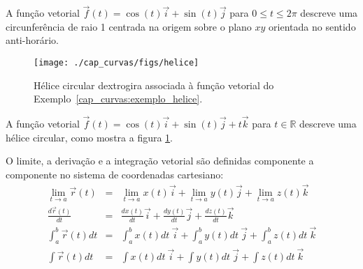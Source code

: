 \begin{ex}
A função vetorial $\vec{f}(t)=\cos(t)\vec{i}+\sin(t)\vec{j}$ para $0\leq t \leq 2\pi$ descreve  uma circunferência de raio 1 centrada na origem sobre o plano $xy$ orientada no sentido anti-horário.
\end{ex}

\begin{figure}%
\begin{center}
    \texttt{[image: ./cap\_curvas/figs/helice]}
\caption{\label{helicedex}Hélice circular dextrogira associada à função vetorial do Exemplo~\ref{cap_curvas:exemplo_helice}.}
  \end{center}
\end{figure}

\begin{ex}\label{cap_curvas:exemplo_helice}
A função vetorial $\vec{f}(t)=\cos(t)\vec{i}+\sin(t)\vec{j}+t\vec{k}$ para $ t \in\mathbb{R}$ descreve uma hélice circular, como mostra a figura \ref{helicedex}.
\end{ex}

O limite, a derivação e a integração vetorial são definidas componente a componente no sistema de coordenadas cartesiano:
\begin{eqnarray}
\lim_{t\to a}\vec{r}(t)&=&\lim_{t\to a}x(t) \vec{i}+\lim_{t\to a}y(t)\vec{j}+\lim_{t\to a}z(t)\vec{k}\label{deflim}\\
\frac{d\vec{r}(t)}{dt}&=&\frac{d x(t)}{dt}\vec{i}+\frac{d y(t)}{dt}\vec{j}+\frac{d z(t)}{dt}\vec{k}\label{defder}\\
\int_{a}^b\vec{r}(t){dt}&=&\int_{a}^bx(t)dt~\!\vec{i}+\int_{a}^by(t)dt~\!\vec{j}+\int_{a}^bz(t)dt~\!\vec{k}\label{defint}\\
\int\vec{r}(t){dt}&=&\int x(t)dt~\!\vec{i}+\int y(t)dt~\!\vec{j}+\int z(t)dt~\!\vec{k}\label{defint2}
\end{eqnarray}


